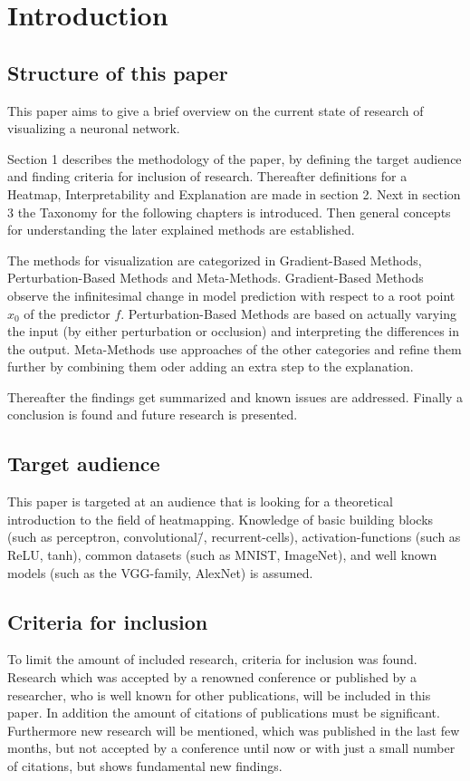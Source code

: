 \section{Introduction}

\subsection{Structure of this paper}
This paper aims to give a brief overview on the current state of research of visualizing a neuronal network. 
\par 
Section 1 describes the methodology of the paper, by defining the target audience and finding criteria for inclusion of research. Thereafter definitions for a Heatmap, Interpretability and Explanation are made in section 2. Next in section 3 the Taxonomy for the following chapters is introduced. Then general concepts for understanding the later explained methods are established.
\par
The methods for visualization are categorized in Gradient-Based Methods, Perturbation-Based Methods and Meta-Methods.
Gradient-Based Methods observe the infinitesimal change in model prediction with respect to a root point \(x_0\) of the predictor \(f\).
Perturbation-Based Methods are based on actually varying the input (by either  perturbation or occlusion) and interpreting the differences in the output.
Meta-Methods use approaches of the other categories and refine them further by combining them oder adding an extra step to the explanation.
\par
Thereafter the findings get summarized and known issues are addressed.
Finally a conclusion is found and future research is presented.

\subsection{Target audience}
This paper is targeted at an audience that is looking for a theoretical introduction to the field of heatmapping. Knowledge of basic building blocks (such as perceptron, convolutional\=/, recurrent-cells), activation-functions (such as ReLU, tanh), common datasets (such as MNIST, ImageNet), and well known models (such as the VGG-family, AlexNet) is assumed.

\subsection{Criteria for inclusion}
To limit the amount of included research, criteria for inclusion was found. Research which was accepted by a renowned conference or published by a researcher, who is well known for other publications, will be included in this paper. In addition the amount of citations of publications must be significant. Furthermore new research will be mentioned, which was published in the last few months, but not accepted by a conference until now or with just a small number of citations, but shows fundamental new findings.